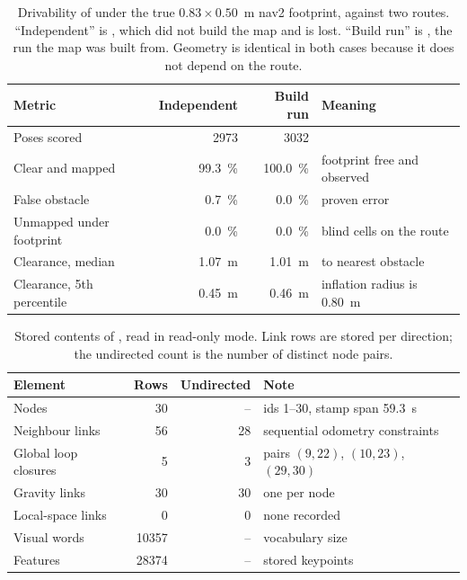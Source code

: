 \documentclass[11pt,a4paper,notitlepage]{report}
\begin{document}
\begin{table}[htbp]
\centering
\caption[Drivability of  under the true nav2 footprint,
against two routes.]{Drivability of  under the true
$0.83\times0.50$~m nav2 footprint, against two routes. ``Independent'' is
, which did not build the map and is lost.
``Build run'' is , the run the map was built
from. Geometry is identical in both cases because it does not depend on the
route.}
\label{tab:map-drivability}
\small
\setlength{\tabcolsep}{4pt}
\begin{tabularx}{\textwidth}{>{\raggedright\arraybackslash}p{}rr>{\raggedright\arraybackslash}X}
\toprule
Metric & Independent & Build run & Meaning \\
\midrule
Poses scored & \num{2973} & \num{3032} & \\
Clear and mapped & \SI{99.3}{\percent} & \SI{100.0}{\percent} & footprint free and observed \\
False obstacle & \SI{0.7}{\percent} & \SI{0.0}{\percent} & proven error \\
Unmapped under footprint & \SI{0.0}{\percent} & \SI{0.0}{\percent} & blind cells on the route \\
Clearance, median & \SI{1.07}{\metre} & \SI{1.01}{\metre} & to nearest obstacle \\
Clearance, 5th percentile & \SI{0.45}{\metre} & \SI{0.46}{\metre} & inflation radius is \SI{0.80}{\metre} \\
\bottomrule
\end{tabularx}
\end{table}

\begin{table}[htbp]
\centering
\caption[Stored contents of .]{Stored contents of
, read in read-only mode. Link rows are stored per
direction; the undirected count is the number of distinct node pairs.}
\label{tab:map-graph}
\small
\begin{tabularx}{\textwidth}{>{\raggedright\arraybackslash}p{}rr>{\raggedright\arraybackslash}X}
\toprule
Element & Rows & Undirected & Note \\
\midrule
Nodes & 30 & -- & ids 1--30, stamp span \SI{59.3}{\second} \\
Neighbour links & 56 & 28 & sequential odometry constraints \\
Global loop closures & 5 & 3 & pairs $(9,22)$, $(10,23)$, $(29,30)$ \\
Gravity links & 30 & 30 & one per node \\
Local-space links & 0 & 0 & none recorded \\
Visual words & \num{10357} & -- & vocabulary size \\
Features & \num{28374} & -- & stored keypoints \\
\bottomrule
\end{tabularx}
\end{table}
\end{document}
